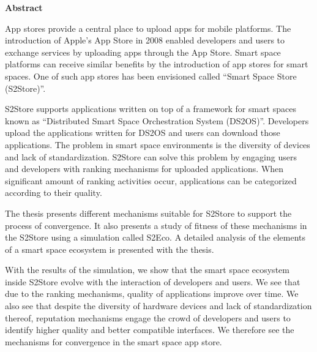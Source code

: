 \thispagestyle{empty}
\vspace*{8\baselineskip}
{\large\textbf{Abstract} }
\par

App stores provide a central place to upload apps for mobile platforms. The introduction of Apple's App Store in 2008 enabled developers and users to exchange services by uploading apps through the App Store. Smart space platforms can receive similar benefits by the introduction of app stores for smart spaces. One of such app stores has been envisioned called ``Smart Space Store (S2Store)''.

S2Store supports applications written on top of a framework for smart spaces known as ``Distributed Smart Space Orchestration System (DS2OS)''. Developers upload the applications written for DS2OS and users can download those applications. The problem in smart space environments is the diversity of devices and lack of standardization. S2Store can solve this problem by engaging users and developers with ranking mechanisms for uploaded applications. When significant amount of ranking activities occur, applications can be categorized according to their quality.

The thesis presents different mechanisms suitable for S2Store to support the process of convergence. It also presents a study of fitness of these mechanisms in the S2Store using a simulation called S2Eco. A detailed analysis of the elements of a smart space ecosystem is presented with the thesis.

With the results of the simulation, we show that the smart space ecosystem inside S2Store evolve with the interaction of developers and users. We see that due to the ranking mechanisms, quality of applications improve over time. We also see that despite the diversity of hardware devices and lack of standardization thereof, reputation mechanisms engage the crowd of developers and users to identify higher quality and better compatible interfaces. We therefore see the mechanisms for convergence in the smart space app store.

\clearpage
